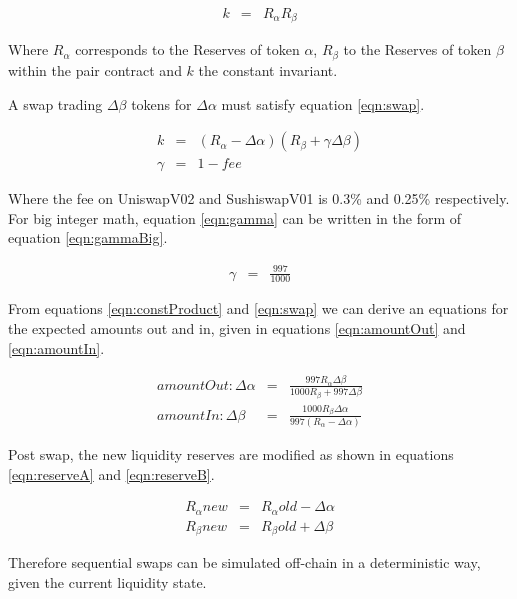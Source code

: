 \documentclass[runningheads]{llncs}
\begin{document}
\begin{eqnarray}
	k  &=& R_{\alpha}  R_{\beta}  \label{eqn:constProduct}
\end{eqnarray}

Where \(R_{\alpha}\) corresponds to the Reserves of token \(\alpha\), \(R_{\beta}\) to the Reserves of token \(\beta\) within the pair contract and \( k \) the constant invariant.

A swap trading \( \Delta\beta\) tokens for \( \Delta\alpha \) must satisfy equation \ref{eqn:swap}.

\begin{eqnarray}
	k  &=& (R_{\alpha} - \Delta\alpha)  (R_{\beta} + \gamma\Delta\beta ) \label{eqn:swap}\\
	\gamma  &=& 1 - fee \label{eqn:gamma}
\end{eqnarray}

Where the fee on UniswapV02 and SushiswapV01 is 0.3\% and 0.25\% respectively. For big integer math, equation \ref{eqn:gamma} can be written in the form of equation \ref{eqn:gammaBig}.

\begin{eqnarray}
	\gamma  &=& \frac{997}{1000} \label{eqn:gammaBig}
\end{eqnarray}

From equations \ref{eqn:constProduct} and \ref{eqn:swap} we can derive an equations for the expected amounts out and in, given in equations \ref{eqn:amountOut} and \ref{eqn:amountIn}.

\begin{eqnarray}
	amountOut: \Delta\alpha  &=& \frac{997 R_{\alpha} \Delta\beta }{1000 R_{\beta} + 997 \Delta\beta} \label{eqn:amountOut}\\
	amountIn: \Delta\beta  &=& \frac{1000 R_{\beta} \Delta\alpha }{997 (R_{\alpha} - \Delta\alpha)} \label{eqn:amountIn}
\end{eqnarray}

Post swap, the new liquidity reserves are modified as shown in equations \ref{eqn:reserveA} and \ref{eqn:reserveB}.

\begin{eqnarray}
	R_{\alpha}{new}  &=& R_{\alpha}{old} - \Delta\alpha  \label{eqn:reserveA}\\
	R_{\beta}{new}  &=& R_{\beta}{old} + \Delta\beta  \label{eqn:reserveB}
\end{eqnarray}

Therefore sequential swaps can be simulated off-chain in a deterministic way, given the current liquidity state.
\end{document}
